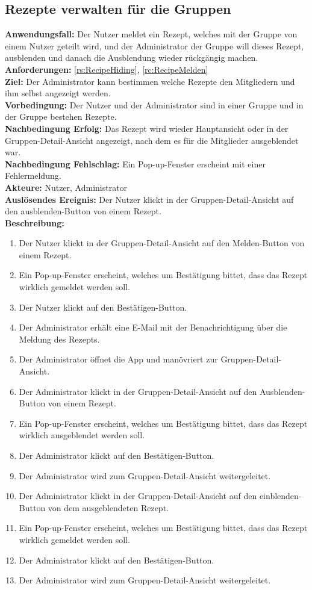 \documentclass[parskip=full]{scrartcl}
\begin{document}
\subsection{Rezepte verwalten für die Gruppen}
\textbf{Anwendungsfall:} Der Nutzer meldet ein Rezept, welches mit der Gruppe von einem Nutzer geteilt wird, und der Administrator der Gruppe will dieses Rezept, ausblenden und danach die Ausblendung wieder rückgängig machen.\\
\textbf{Anforderungen:} \ref{rs:RecipeHiding}, \ref{rc:RecipeMelden}\\
\textbf{Ziel:} Der Administrator kann bestimmen welche Rezepte den Mitgliedern und ihm selbst angezeigt werden.\\
\textbf{Vorbedingung:} Der Nutzer und der Administrator sind in einer Gruppe und in der Gruppe bestehen Rezepte.\\
\textbf{Nachbedingung Erfolg:} Das Rezept wird wieder Hauptansicht oder in der Gruppen-Detail-Ansicht angezeigt, nach dem es für die Mitglieder ausgeblendet war.\\
\textbf{Nachbedingung Fehlschlag:} Ein Pop-up-Fenster erscheint mit einer Fehlermeldung.\\
\textbf{Akteure:} Nutzer, Administrator  \\
\textbf{Auslösendes Ereignis:} Der Nutzer klickt in der Gruppen-Detail-Ansicht auf den ausblenden-Button von einem Rezept.\\
\textbf{Beschreibung:}
\begin{enumerate}
    \item Der Nutzer klickt in der Gruppen-Detail-Ansicht auf den Melden-Button von einem Rezept.
    \item Ein Pop-up-Fenster erscheint, welches um Bestätigung bittet, dass das Rezept wirklich gemeldet werden soll.
    \item Der Nutzer klickt auf den Bestätigen-Button.
    \item Der Administrator erhält eine E-Mail mit der Benachrichtigung über die Meldung des Rezepts.
    \item Der Administrator öffnet die App und manövriert zur Gruppen-Detail-Ansicht.
    \item Der Administrator klickt in der Gruppen-Detail-Ansicht auf den Ausblenden-Button von einem Rezept.
    \item Ein Pop-up-Fenster erscheint, welches um Bestätigung bittet, dass das Rezept wirklich ausgeblendet werden soll.
    \item Der Administrator klickt auf den Bestätigen-Button.
    \item Der Administrator wird zum Gruppen-Detail-Ansicht weitergeleitet.
    \item Der Administrator klickt in der Gruppen-Detail-Ansicht auf den einblenden-Button von dem ausgeblendeten Rezept.
    \item Ein Pop-up-Fenster erscheint, welches um Bestätigung bittet, dass das Rezept wirklich gemeldet werden soll.
    \item Der Administrator klickt auf den Bestätigen-Button.
    \item Der Administrator wird zum Gruppen-Detail-Ansicht weitergeleitet.
\end{enumerate}
\end{document}
